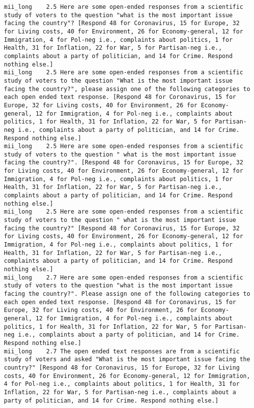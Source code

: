 \begin{lstlisting}[label=lst:promptvariants]
mii_long	2.5	Here are some open-ended responses from a scientific study of voters to the question "what is the most important issue facing the country"? [Respond 48 for Coronavirus, 15 for Europe, 32 for Living costs, 40 for Environment, 26 for Economy-general, 12 for Immigration, 4 for Pol-neg i.e., complaints about politics, 1 for Health, 31 for Inflation, 22 for War, 5 for Partisan-neg i.e., complaints about a party of politician, and 14 for Crime. Respond nothing else.]
mii_long	2.5	Here are some open-ended responses from a scientific study of voters to the question "What is the most important issue facing the country?", please assign one of the following categories to each open ended text response. [Respond 48 for Coronavirus, 15 for Europe, 32 for Living costs, 40 for Environment, 26 for Economy-general, 12 for Immigration, 4 for Pol-neg i.e., complaints about politics, 1 for Health, 31 for Inflation, 22 for War, 5 for Partisan-neg i.e., complaints about a party of politician, and 14 for Crime. Respond nothing else.]
mii_long	2.5	Here are some open-ended responses from a scientific study of voters to the question " what is the most important issue facing the country?". [Respond 48 for Coronavirus, 15 for Europe, 32 for Living costs, 40 for Environment, 26 for Economy-general, 12 for Immigration, 4 for Pol-neg i.e., complaints about politics, 1 for Health, 31 for Inflation, 22 for War, 5 for Partisan-neg i.e., complaints about a party of politician, and 14 for Crime. Respond nothing else.]
mii_long	2.5	Here are some open-ended responses from a scientific study of voters to the question " what is the most important issue facing the country?" [Respond 48 for Coronavirus, 15 for Europe, 32 for Living costs, 40 for Environment, 26 for Economy-general, 12 for Immigration, 4 for Pol-neg i.e., complaints about politics, 1 for Health, 31 for Inflation, 22 for War, 5 for Partisan-neg i.e., complaints about a party of politician, and 14 for Crime. Respond nothing else.]
mii_long	2.7	Here are some open-ended responses from a scientific study of voters to the question "what is the most important issue facing the country?". Please assign one of the following categories to each open ended text response. [Respond 48 for Coronavirus, 15 for Europe, 32 for Living costs, 40 for Environment, 26 for Economy-general, 12 for Immigration, 4 for Pol-neg i.e., complaints about politics, 1 for Health, 31 for Inflation, 22 for War, 5 for Partisan-neg i.e., complaints about a party of politician, and 14 for Crime. Respond nothing else.]
mii_long	2.7	The open ended text responses are from a scientific study of voters and asked "What is the most important issue facing the country?" [Respond 48 for Coronavirus, 15 for Europe, 32 for Living costs, 40 for Environment, 26 for Economy-general, 12 for Immigration, 4 for Pol-neg i.e., complaints about politics, 1 for Health, 31 for Inflation, 22 for War, 5 for Partisan-neg i.e., complaints about a party of politician, and 14 for Crime. Respond nothing else.]

\end{lstlisting}
